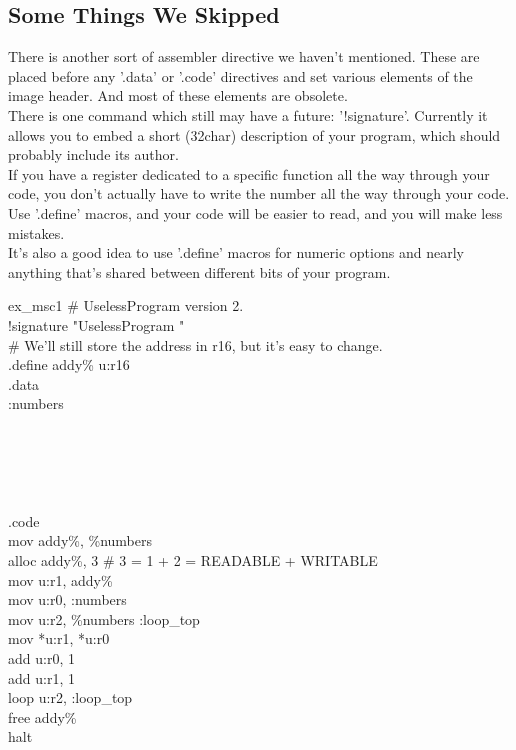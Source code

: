 \documentclass[a4paper,oneside,openany]{book}
\begin{document}
\subsection{Some Things We Skipped}
There is another sort of assembler directive we haven't mentioned.
These are placed before any '.data' or '.code' directives and set various
elements of the image header. And most of these elements are obsolete.\\
There is one command which still may have a future: '!signature'. Currently
it allows you to embed a short (32char) description of your program, which
should probably include its author.\\
If you have a register dedicated to a specific function all the
way through your code, you don't actually have to write the number
all the way through your code. Use '.define' macros, and your code will be
easier to read, and you will make less mistakes.\\
It's also a good idea to use '.define' macros for numeric options and
nearly anything that's shared between different bits of your program.
\begin{codefile}{ex\_msc1}
\# UselessProgram version 2.\\
!signature "UselessProgram "\\
\# We'll still store the address in r16, but it's easy to change.\\
.define addy\% u:r16\\
.data\\
:numbers\\
\\
\\
\\
\\
\\
.code\\
\>	mov addy\%, \%numbers\\
\>	alloc addy\%, 3 \# 3 = 1 + 2 = READABLE + WRITABLE\\
\>	mov u:r1, addy\%\\
\>	mov u:r0, :numbers\\
\>	mov u:r2, \%numbers
:loop\_top\\
\>	mov *u:r1, *u:r0\\
\>	add u:r0, 1\\
\>	add u:r1, 1\\
\>	loop u:r2, :loop\_top\\
\>	free addy\%\\
\>	halt
\end{codefile}
\end{document}
